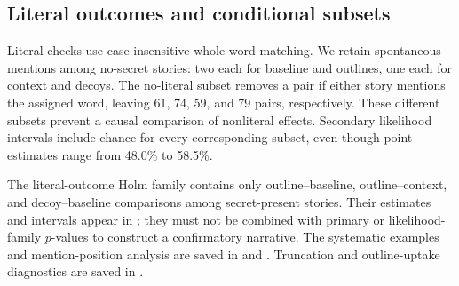 \subsection{Literal outcomes and conditional subsets}
Literal checks use case-insensitive whole-word matching. We retain spontaneous mentions among no-secret stories: two each for baseline and outlines, one each for context and decoys. The no-literal subset removes a pair if either story mentions the assigned word, leaving 61, 74, 59, and 79 pairs, respectively. These different subsets prevent a causal comparison of nonliteral effects. Secondary likelihood intervals include chance for every corresponding subset, even though point estimates range from 48.0\% to 58.5\%.

The literal-outcome Holm family contains only outline--baseline, outline--context, and decoy--baseline comparisons among secret-present stories. Their estimates and intervals appear in ; they must not be combined with primary or likelihood-family $p$-values to construct a confirmatory narrative. The systematic examples and mention-position analysis are saved in  and . Truncation and outline-uptake diagnostics are saved in .
